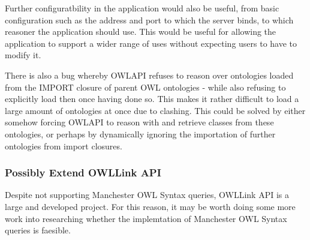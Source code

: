 \documentclass{article}
\begin{document}
Further configuratbility in the application would also be useful, from basic
configuration such as the address and port to which the server binds, to which
reasoner the application should use. This would be useful for allowing the
application to support a wider range of uses without expecting users to have to
modify it.

There is also a bug whereby OWLAPI refuses to reason over ontologies loaded from
the IMPORT closure of parent OWL ontologies - while also refusing to explicitly
load then once having done so. This makes it rather difficult to load a large
amount of ontologies at once due to clashing. This could be solved by either
somehow forcing OWLAPI to reason with and retrieve classes from these
ontologies, or perhaps by dynamically ignoring the importation of further
ontologies from import closures.

\subsubsection{Possibly Extend OWLLink API}

Despite not supporting Manchester OWL Syntax queries, OWLLink API is a large and
developed project. For this reason, it may be worth doing some
more work into researching whether the implemtation of Manchester OWL Syntax
queries is faesible.
\end{document}
